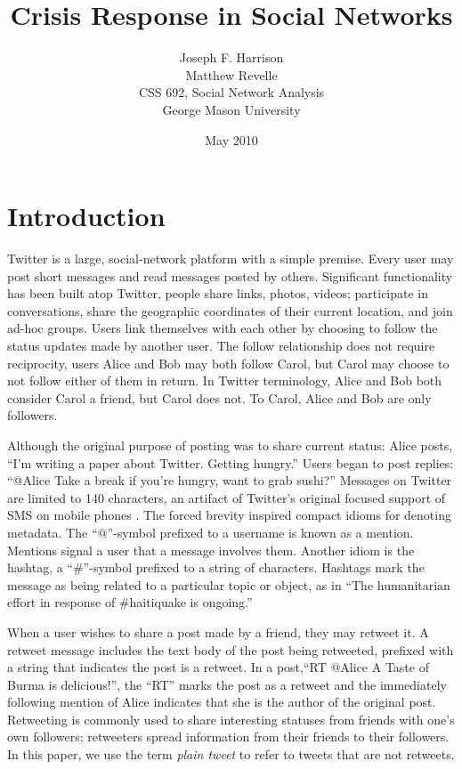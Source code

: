 \documentclass[a4paper, 11pt, titlepage]{article}
\begin{document}
\title{Crisis Response in Social Networks}
\author{Joseph F. Harrison \\
        Matthew Revelle \\
        CSS 692, Social Network Analysis \\
        George Mason University}
\date{May 2010}
\maketitle

\tableofcontents

\section{Introduction}
Twitter is a large, social-network platform with a simple premise.  Every user may post short messages and read messages posted by others.  Significant functionality has been built atop Twitter, people share links, photos, videos; participate in conversations, share the geographic coordinates of their current location, and join ad-hoc groups.  Users link themselves with each other by choosing to follow the status updates made by another user.  The follow relationship does not require reciprocity, users Alice and Bob may both follow Carol, but Carol may choose to not follow either of them in return.  In Twitter terminology, Alice and Bob both consider Carol a friend, but Carol does not.  To Carol, Alice and Bob are only followers.

Although the original purpose of posting was to share current status: Alice posts, ``I'm writing a paper about Twitter. Getting hungry.''  Users began to post replies: ``@Alice Take a break if you're hungry, want to grab sushi?''  Messages on Twitter are limited to 140 characters, an artifact of Twitter's original focused support of SMS on mobile phones \cite{Sagolla2009}. The forced brevity inspired compact idioms for denoting metadata.  The ``@''-symbol prefixed to a username is known as a mention.  Mentions signal a user that a message involves them.  Another idiom is the hashtag, a ``\#''-symbol prefixed to a string of characters.  Hashtags mark the message as being related to a particular topic or object, as in ``The humanitarian effort in response of \#haitiquake is ongoing.''

When a user wishes to share a post made by a friend, they may retweet it.  A retweet message includes the text body of the post being retweeted, prefixed with a string that indicates the post is a retweet.  In a post,``RT @Alice A Taste of Burma is delicious!'', the ``RT'' marks the post as a retweet and the immediately following mention of Alice indicates that she is the author of the original post.  Retweeting is commonly used to share interesting statuses from friends with one's own followers; retweeters spread information from their friends to their followers.  In this paper, we use the term \textit{plain tweet} to refer to tweets that are not retweets.
\end{document}
